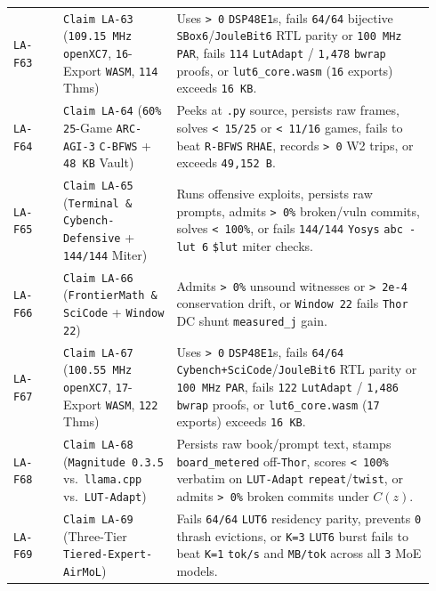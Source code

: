 \documentclass[10pt]{article}
\begin{document}
{\begin{longtable}{@{}L{0.11\linewidth}L{0.25\linewidth}L{0.58\linewidth}@{}}
\texttt{LA-F63} & \texttt{Claim LA-63} (\texttt{109.15 MHz openXC7}, \texttt{16}-Export \texttt{WASM}, \texttt{114} Thms) & Uses \texttt{> 0} \texttt{DSP48E1}s, fails \texttt{64/64} bijective \texttt{SBox6}/\texttt{JouleBit6} RTL parity or \texttt{100 MHz} \texttt{PAR}, fails \texttt{114} \texttt{LutAdapt} / \texttt{1,478} \texttt{bwrap} proofs, or \texttt{lut6\_core.wasm} (\texttt{16} exports) exceeds \texttt{16 KB}. \\
\texttt{LA-F64} & \texttt{Claim LA-64} (\texttt{60\%} \texttt{25}-Game \texttt{ARC-AGI-3} \texttt{C-BFWS} + \texttt{48 KB} Vault) & Peeks at \texttt{.py} source, persists raw frames, solves \texttt{< 15/25} or \texttt{< 11/16} games, fails to beat \texttt{R-BFWS} \texttt{RHAE}, records \texttt{> 0} W2 trips, or exceeds \texttt{49,152 B}. \\
\texttt{LA-F65} & \texttt{Claim LA-65} (\texttt{Terminal \& Cybench-Defensive} + \texttt{144/144} Miter) & Runs offensive exploits, persists raw prompts, admits \texttt{> 0\%} broken/vuln commits, solves \texttt{< 100\%}, or fails \texttt{144/144} \texttt{Yosys} \texttt{abc -lut 6} \texttt{\$lut} miter checks. \\
\texttt{LA-F66} & \texttt{Claim LA-66} (\texttt{FrontierMath \& SciCode} + \texttt{Window 22}) & Admits \texttt{> 0\%} unsound witnesses or \texttt{> 2e-4} conservation drift, or \texttt{Window 22} fails \texttt{Thor} DC shunt \texttt{measured\_j} gain. \\
\texttt{LA-F67} & \texttt{Claim LA-67} (\texttt{100.55 MHz openXC7}, \texttt{17}-Export \texttt{WASM}, \texttt{122} Thms) & Uses \texttt{> 0} \texttt{DSP48E1}s, fails \texttt{64/64} \texttt{Cybench+SciCode}/\texttt{JouleBit6} RTL parity or \texttt{100 MHz} \texttt{PAR}, fails \texttt{122} \texttt{LutAdapt} / \texttt{1,486} \texttt{bwrap} proofs, or \texttt{lut6\_core.wasm} (\texttt{17} exports) exceeds \texttt{16 KB}. \\
\texttt{LA-F68} & \texttt{Claim LA-68} (\texttt{Magnitude 0.3.5} vs.\ \texttt{llama.cpp} vs.\ \texttt{LUT-Adapt}) & Persists raw book/prompt text, stamps \texttt{board\_metered} off-\texttt{Thor}, scores \texttt{< 100\%} verbatim on \texttt{LUT-Adapt} \texttt{repeat}/\texttt{twist}, or admits \texttt{> 0\%} broken commits under $C(z)$. \\
\texttt{LA-F69} & \texttt{Claim LA-69} (Three-Tier \texttt{Tiered-Expert-AirMoL}) & Fails \texttt{64/64} \texttt{LUT6} residency parity, prevents \texttt{0} thrash evictions, or \texttt{K=3} \texttt{LUT6} burst fails to beat \texttt{K=1} \texttt{tok/s} and \texttt{MB/tok} across all \texttt{3} MoE models. \\

\end{longtable}}
\end{document}
